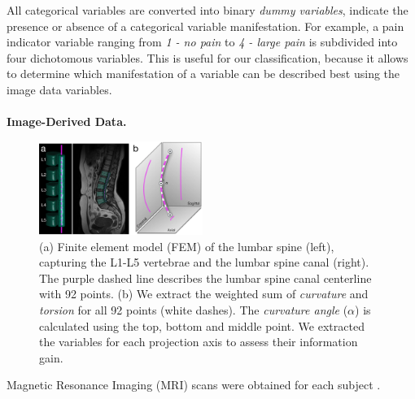 \documentclass[a4paper,twoside]{style/article}
\begin{document}
All categorical variables are converted into binary \emph{dummy variables}, indicate the presence or absence of a categorical variable manifestation. %
For example, a pain indicator variable ranging from \emph{1 - no pain} to \emph{4 - large pain} is subdivided into four dichotomous variables.
This is useful for our classification, because it allows to determine which manifestation of a variable can be described best using the image data variables.
\\\\
\noindent \textbf{Image-Derived Data.}
\begin{figure}[!t]
  \centering
  \includegraphics[width=0.475\textwidth]{figures/centerline}
  \caption{
	(a) Finite element model (FEM) of the lumbar spine (left), capturing the L1-L5 vertebrae and the lumbar spine canal (right).
	The purple dashed line describes the lumbar spine canal centerline with 92 points.
	(b) We extract the weighted sum of \emph{curvature} and \emph{torsion} for all 92 points (white dashes).
	The \emph{curvature angle} ($\alpha$) is calculated using the top, bottom and middle point.
	We extracted the variables for each projection axis to assess their information gain.
	}
  \label{fig:centerline}
\end{figure}
Magnetic Resonance Imaging (MRI) scans were obtained for each subject \cite{Hegenscheid2013}.
\end{document}
